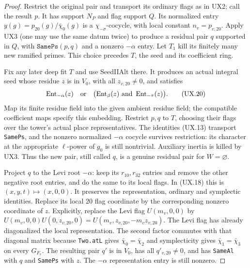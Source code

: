 \begin{proof}
Restrict the original pair and transport its ordinary
flags as in UX2; call the result $p$.  It has support
$N_P$ and flag support $Q$.  Its normalized entry
$y(g)=p_{20}(g)/\bar\chi_0(g)$ is a
$\chi_{-\sigma}$-cocycle, with local constant
$n_v=p_{v,20}$.  Apply UX3 (one may use the same
datum twice) to produce a residual pair $q$ supported
in $Q$, with $\mathtt{SamePs}(p,q)$ and a nonzero
$-\alpha$ entry.  Let $T_1$ kill its finitely many
new ramified primes.  This choice precedes $T$, the
seed and its coefficient ring.

Fix any later deep fit $T$ and use SeedIIAlt there.
It produces an actual integral seed whose residue $z$
is in $V_0$, with all $z_{v,20}\ne0$, and satisfies
\[
 \operatorname{Ent}_{-\alpha}(z)\quad\hbox{or}\quad
 \bigl(\operatorname{Ent}_{\beta}(z)\ \hbox{and}\
       \operatorname{Ent}_{-\tau}(z)\bigr).
 \tag{UX.20}
\]
Map its finite residue field into the given ambient
residue field; the compatible coefficient maps specify
this embedding.  Restrict $p,q$ to $T$, choosing their
flags over the tower's actual place representatives.
The identities (UX.13) transport \texttt{SamePs},
and the nonzero normalized $-\alpha$ cocycle survives
restriction: its character at the appropriate
$\ell$-power of $g_0$ is still nontrivial.  Auxiliary
inertia is killed by UX3.  Thus the new pair, still
called $q$, is a genuine residual pair for $W=\varnothing$.

Project $q$ to the Levi root $-\alpha$: keep its
$r_{10},r_{32}$ entries and remove the other negative
root entries, and do the same to its local flags.
In (UX.18) this is $(x,y,t)\mapsto(x,0,0)$.
It preserves the representation, ordinary and
symplectic identities.  Replace its local $20$ flag
coordinate by the corresponding nonzero coordinate
 of $z$.  Explicitly, replace the Levi flag
 $U(m_v,0,0)$ by
 $U(m_v,0,0)U(0,z_{v,20},0)
   =U(m_v,z_{v,20},-m_vz_{v,20})$.
 The Levi flag has already diagonalized the local
 representation.  The second factor commutes with that
 diagonal matrix because \texttt{Two.atL} gives
 $\bar\chi_0=\bar\chi_2$ and symplecticity gives
 $\bar\chi_1=\bar\chi_3$ on every $G_{F_v}$.
 The resulting pair
$q'$ is in $V_0$, has all $q'_{v,20}\ne0$, and has
\texttt{SameAl} with $q$ and \texttt{SamePs} with $z$.
The $-\alpha$ representation entry is still nonzero.


\end{proof}
